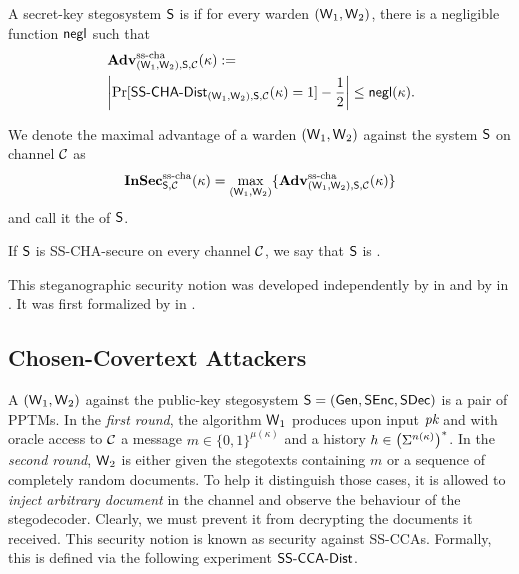 A secret-key stegosystem $\operatorname{\mathsf{S}}$ is  if for
every warden $(\operatorname{\mathsf{W}}_{1},\operatorname{\mathsf{W}}_{2})$, there is a negligible function
$\operatorname{\mathsf{negl}}$ such that
\begin{align*}
  &\Adv_{(\Ward_{1},\Ward_{2}),\Steg,\chan}^{\sscha}(\kappa):=\\
  &\left|\Pr[\SSCHA-Dist_{(\Ward_{1},\Ward_{2}),\Steg,\chan}(\kappa) =
    1] -\frac{1}{2}\right| \leq \negl(\kappa).
\end{align*}

We denote the maximal advantage of a warden $(\operatorname{\mathsf{W}}_{1},\operatorname{\mathsf{W}}_{2})$
against the system $\operatorname{\mathsf{S}}$ on channel $\mathcal{C}$ as
\begin{align*}
\operatorname{\mathbf{InSec}}^{\operatorname{ss-cha}}_{\operatorname{\mathsf{S}},\mathcal{C}}(\kappa)=\max_{(\operatorname{\mathsf{W}}_{1},\operatorname{\mathsf{W}}_{2})}\{\operatorname{\mathbf{Adv}}^{\operatorname{ss-cha}}_{(\operatorname{\mathsf{W}}_{1},\operatorname{\mathsf{W}}_{2}),\operatorname{\mathsf{S}},\mathcal{C}}(\kappa)\}
\end{align*}
and call it the  of $\operatorname{\mathsf{S}}$.

If $\operatorname{\mathsf{S}}$ is \acs{SS-CHA}-secure on every channel $\mathcal{C}$, we say that
$\operatorname{\mathsf{S}}$ is . 

This steganographic security notion was developed independently by
\citeauthor{katzenbeisser2002defining} in
\cite{katzenbeisser2002defining} and by \citeauthor{hopper2002provably}
in \cite{hopper2002provably}. It was first formalized by
\citeauthor{hopper2002provably} in \cite{hopper2002provably}. 

\subsection*{Chosen-Covertext Attackers}
A  $(\operatorname{\mathsf{W}}_{1},\operatorname{\mathsf{W}}_{2})$ against the public-key
stegosystem $\operatorname{\mathsf{S}}=(\operatorname{\mathsf{Gen}},\operatorname{\mathsf{SEnc}},\operatorname{\mathsf{SDec}})$ is a pair of \acp{PPTM}. In the
\emph{first round}, the algorithm $\operatorname{\mathsf{W}}_{1}$ produces upon input $\textit{pk}$
and with oracle access to $\mathcal{C}$ a message $m\in \{0,1\}^{\mu(\kappa)}$
and a history $h\in \left(\Sigma^{n(\kappa)}\right)^{*}$. In the \emph{second round},
$\operatorname{\mathsf{W}}_{2}$ is either given the stegotexts containing $m$ or a sequence
of completely random documents. To help it distinguish those cases, it
is allowed to \emph{inject arbitrary document} in the channel and
observe the behaviour of the stegodecoder. Clearly, we must prevent it
from decrypting the documents it received. This security notion is known
as security against \acp{SS-CCA}. Formally, this is defined via the
following experiment $\SSCCA-Dist$.


